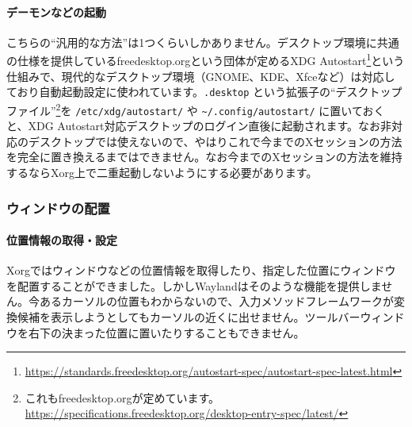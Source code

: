 \documentclass[mingoth,a4paper]{jsarticle}
\begin{document}
\paragraph{デーモンなどの起動}
こちらの``汎用的な方法''は1つくらいしかありません。デスクトップ環境に共通の仕様を提供しているfreedesktop.orgという団体が定めるXDG Autostart\footnote{\url{https://standards.freedesktop.org/autostart-spec/autostart-spec-latest.html}}という仕組みで、現代的なデスクトップ環境（GNOME、KDE、Xfceなど）は対応しており自動起動設定に使われています。\verb|.desktop| という拡張子の``デスクトップファイル''\footnote{これもfreedesktop.orgが定めています。\url{https://specifications.freedesktop.org/desktop-entry-spec/latest/}}を \verb|/etc/xdg/autostart/| や \verb|~/.config/autostart/| に置いておくと、XDG Autostart対応デスクトップのログイン直後に起動されます。なお非対応のデスクトップでは使えないので、やはりこれで今までのXセッションの方法を完全に置き換えるまではできません。なお今までのXセッションの方法を維持するならXorg上で二重起動しないようにする必要があります。


\subsubsection{ウィンドウの配置}
\paragraph{位置情報の取得・設定} Xorgではウィンドウなどの位置情報を取得したり、指定した位置にウィンドウを配置することができました。しかしWaylandはそのような機能を提供しません。今あるカーソルの位置もわからないので、入力メソッドフレームワークが変換候補を表示しようとしてもカーソルの近くに出せません。ツールバーウィンドウを右下の決まった位置に置いたりすることもできません。
\end{document}

